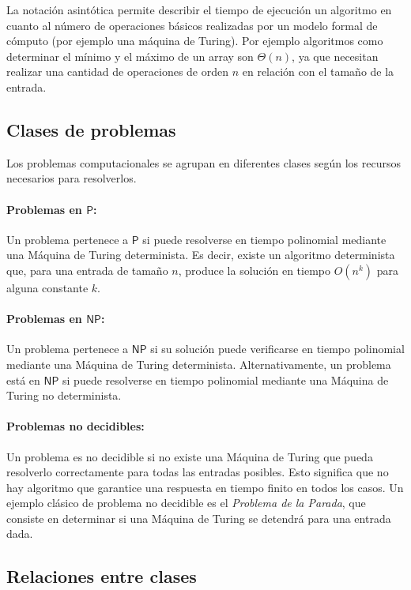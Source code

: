 \documentclass{article}
\begin{document}
La notación asintótica permite describir el tiempo de ejecución un algoritmo en cuanto al número de operaciones básicos realizadas
por un modelo formal de cómputo (por ejemplo una máquina de Turing). Por ejemplo algoritmos como determinar el mínimo y el máximo de
un array son $\Theta(n)$, ya que necesitan realizar una cantidad de operaciones de orden $n$ en relación con el tamaño de la entrada.

\subsection{Clases de problemas}

Los problemas computacionales se agrupan en diferentes clases según los recursos necesarios para resolverlos.

\paragraph{Problemas en $\mathsf{P}$:}
Un problema pertenece a $\mathsf{P}$ si puede resolverse en tiempo polinomial mediante una Máquina de Turing determinista. Es decir, existe un algoritmo determinista que, para una entrada de tamaño $n$, produce la solución en tiempo $O(n^k)$ para alguna constante $k$.

\paragraph{Problemas en $\mathsf{NP}$:}
Un problema pertenece a $\mathsf{NP}$ si su solución puede verificarse en tiempo polinomial mediante una Máquina de Turing determinista. Alternativamente, un problema está en $\mathsf{NP}$ si puede resolverse en tiempo polinomial mediante una Máquina de Turing no determinista.
\paragraph{Problemas no decidibles:}
Un problema es no decidible si no existe una Máquina de Turing que pueda resolverlo correctamente para todas las entradas posibles. Esto significa que no hay algoritmo que garantice una respuesta en tiempo finito en todos los casos. Un ejemplo clásico de problema no decidible es el \textit{Problema de la Parada}, que consiste en determinar si una Máquina de Turing se detendrá para una entrada dada.
\subsection{Relaciones entre clases}
\end{document}
